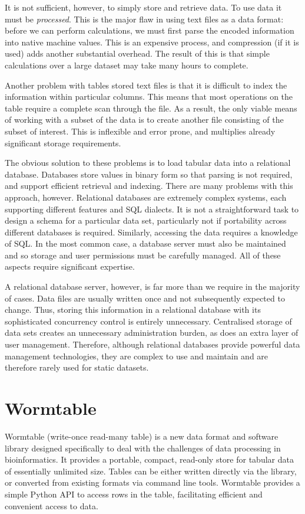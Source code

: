\documentclass{bioinfo}
\begin{document}
It is not sufficient, however, to simply store and retrieve data. To use data
it must be \emph{processed}. This is the major flaw in 
using text files as a data format: before we can perform calculations, we 
must first parse the encoded information into native 
machine values. This is an expensive process, and 
compression (if it is used) adds another substantial overhead. The result 
of this is that simple calculations over a large dataset may take 
many hours to complete.

Another problem with tables stored text files is that it is difficult 
to index the information within particular columns. 
This means that most operations on the table require a complete scan 
through the file. As a result, the only viable means of 
working with a subset of the data
is to create another file consisting of the subset of interest. 
This is inflexible and error prone, and multiplies already significant  
storage requirements.

The obvious solution to these problems is to load tabular data into a
relational database. Databases store values in binary form so that parsing is 
not required, and support efficient retrieval and indexing. There 
are many problems with this approach, however. Relational databases are 
extremely complex systems, each supporting different features and SQL 
dialects. It is not a straightforward task to design a schema for a 
particular data set, particularly not if portability across different 
databases is required. Similarly, accessing the data requires a knowledge
of SQL. In the most common case, a database server must also be maintained
and so storage and user permissions must be carefully managed. All of 
these aspects require significant expertise.

A relational database server, however, is far more than we require in the 
majority of cases. Data files are usually written once and 
not subsequently expected to change.
Thus, storing this information 
in a relational database with its sophisticated concurrency control
is entirely unnecessary. Centralised storage of data sets
creates an unnecessary administration burden, as does an extra
layer of user management. Therefore, although relational databases
provide powerful data management technologies, they are complex
to use and maintain and are therefore rarely used for 
static datasets.

\section{Wormtable}
Wormtable (write-once read-many table) 
is a new data format and software library designed specifically
to deal with the challenges of data processing in bioinformatics.
It provides a portable, compact, read-only store for tabular
data of essentially unlimited size. Tables can
be either written directly via the library, or converted
from existing formats via command line tools. 
Wormtable provides a simple Python API to access rows
in the table, facilitating efficient and convenient access to 
data.
\end{document}
